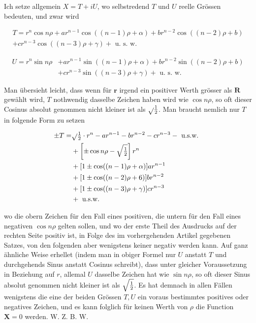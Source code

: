 \documentclass[twoside,12pt, showframe]{memoir}
\let\oldfrac\frac
\def\frac#1#2{\mathchoice{\tfrac{#1}{#2}}{\oldfrac{#1}{#2}}{\genfrac{}{}{}{2}{#1}{#2\mathstrut}}{\genfrac{}{}{}{3}{#1}{#2\mathstrut}}}
\begin{document}
Ich setze allgemein \(X=T+i U\), wo selbstredend \(T\) und \(U\) reelle Grössen bedeuten, und zwar wird

\[
\begin{gathered}
T=r^{n} \cos n \rho+a r^{n-1} \cos ((n-1) \rho+\alpha)+b r^{n-2} \cos ((n-2) \rho+b) \\
+c r^{n-3} \cos ((n-3) \rho+\gamma)+\text { u. s. w. }
\end{gathered}
\]

\[
\begin{aligned}
U=r^{n} \sin n \rho & +a r^{n-1} \sin ((n-1) \rho+\alpha)+b r^{n-2} \sin ((n-2) \rho+b) \\
& +c r^{n-3} \sin ((n-3) \rho+\gamma)+\text { u. s. w. }
\end{aligned}
\]

Man übersieht leicht, dass wenn für \(\boldsymbol{r}\) irgend ein positiver Werth grösser als \(\boldsymbol{R}\) gewählt wird, \(T\) nothwendig dasselbe Zeichen haben wird wie \(\cos n \rho\), so oft dieser Cosinus absolut genommen nicht kleiner ist als \(\sqrt{ } \frac{1}{2}\). Man braucht nemlich nur \(T\) in folgende Form zu setzen

\[
\begin{aligned}
\pm T= & \sqrt{ } \frac{1}{2} \cdot r^{n}-a r^{n-1}-b r^{n-2}-c r^{n-3}-\text { u.s.w. } \\
& +\left[ \pm \cos n \rho-\sqrt{\frac{1}{2}}\right] r^{n} \\
& +[1 \pm \cos ((n-1) \rho+\alpha)] a r^{n-1} \\
& +[1 \pm \cos ((n-2) \rho+6)] b r^{n-2} \\
& +[1 \pm \cos ((n-3) \rho+\gamma)] c r^{n-3} \\
& + \text { u.s.w. }
\end{aligned}
\]

wo die obern Zeichen für den Fall eines positiven, die untern für den Fall eines negativen \(\cos n \rho\) gelten sollen, und wo der erste Theil des Ausdrucks auf der rechten Seite positiv ist, in Folge des im vorhergehenden Artikel gegebenen Satzes, von den folgenden aber wenigstens keiner negativ werden kann. Auf ganz ähnliche Weise erhellet (indem man in obiger Formel nur \(U\) anstatt \(T\) und durchgehends Sinus anstatt Cosinus schreibt), dass unter gleicher Voraussetzung in Beziehung auf \(r\), allemal \(U\) dasselbe Zeichen hat wie \(\sin n \rho\), so oft dieser Sinus absolut genommen nicht kleiner ist als \(\sqrt{\frac{1}{2}}\). Es hat demnach in allen Fällen wenigstens die eine der beiden Grössen \(T, U\) ein voraus bestimmtes positives oder negatives Zeichen, und es kann folglich für keinen Werth von \(\rho\) die Function \(\boldsymbol{X}=0\) werden. W. Z. B. W.
\end{document}
